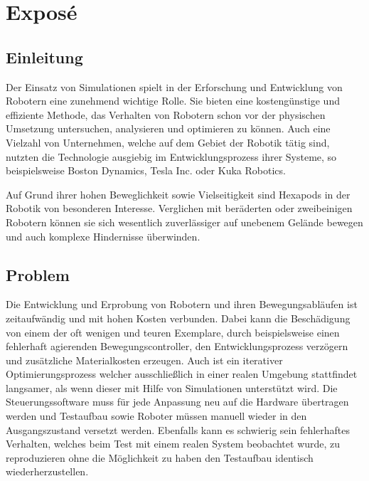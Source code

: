 \chapter{Exposé}
\label{ch:expose}



\section{Einleitung}
Der Einsatz von Simulationen spielt in der Erforschung und Entwicklung von Robotern eine zunehmend wichtige Rolle\cite{afzal2020study}. 
Sie bieten eine kostengünstige und effiziente Methode, das Verhalten von Robotern schon vor der physischen Umsetzung untersuchen, analysieren und optimieren zu können\cite{de2019analysis}. 
Auch eine Vielzahl von Unternehmen, welche auf dem Gebiet der Robotik tätig sind, nutzten die Technologie ausgiebig im Entwicklungsprozess ihrer Systeme, so beispielsweise Boston Dynamics\cite{BostonDynamicsSimulation}, Tesla Inc.\cite{TeslaAiDay2022} oder Kuka Robotics\cite{KukaSim}.

Auf Grund ihrer hohen Beweglichkeit sowie Vielseitigkeit sind Hexapods in der Robotik von besonderen Interesse. 
Verglichen mit beräderten oder zweibeinigen Robotern können sie sich wesentlich zuverlässiger auf unebenem Gelände bewegen und auch komplexe Hindernisse überwinden\cite{barai2013smart, atifystructure}.

\section{Problem}

Die Entwicklung und Erprobung von Robotern und ihren Bewegungsabläufen ist zeitaufwändig und mit hohen Kosten verbunden.
Dabei kann die Beschädigung von einem der oft wenigen und teuren Exemplare, durch beispielsweise einen fehlerhaft agierenden Bewegungscontroller, den Entwicklungsprozess verzögern und zusätzliche Materialkosten erzeugen.
Auch ist ein iterativer Optimierungsprozess welcher ausschließlich in einer realen Umgebung stattfindet langsamer, als wenn dieser mit Hilfe von Simulationen unterstützt wird.
Die Steuerungssoftware muss für jede Anpassung neu auf die Hardware übertragen werden und Testaufbau sowie Roboter müssen manuell wieder in den Ausgangszustand versetzt werden.
Ebenfalls kann es schwierig sein fehlerhaftes Verhalten, welches beim Test mit einem realen System beobachtet wurde, zu reproduzieren ohne die Möglichkeit zu haben den Testaufbau identisch wiederherzustellen.

